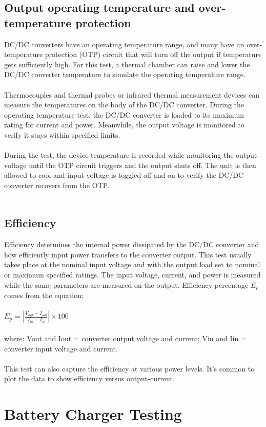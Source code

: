 \subsection{Output operating temperature and over-temperature protection} 

DC/DC converters have an operating temperature range, and many have an over-temperature protection (OTP) circuit that will turn off the output if temperature gets sufficiently high. For this test, a thermal chamber can raise and lower the DC/DC converter temperature to simulate the operating temperature range.
\\ \\
Thermocouples and thermal probes or infrared thermal measurement devices can measure the temperatures on the body of the DC/DC converter. During the operating temperature test, the DC/DC converter is loaded to its maximum rating for current and power. Meanwhile, the output voltage is monitored to verify it stays within specified limits.
\\ \\
During the test, the device temperature is recorded while monitoring the output voltage until the OTP circuit triggers and the output shuts off. The unit is then allowed to cool and input voltage is toggled off and on to verify the DC/DC converter recovers from the OTP.
\\ \\
\subsection{Efficiency} 

Efficiency determines the internal power dissipated by the DC/DC converter and how efficiently input power transfers to the converter output. This test usually takes place at the nominal input voltage and with the output load set to nominal or maximum specified ratings. The input voltage, current, and power is measured while the same parameters are measured on the output. Efficiency percentage $E_{p}$ comes from the equation:
\\ \\
\hspace*{5cm}$E_{p}$ = $\left | \frac{V_{out}-I_{out}}{V_{in}-I_{in}} \right | \times 100$
\\ \\
where:
Vout and Iout = converter output voltage and current;
Vin and Iin = converter input voltage and current.
\\ \\
This test can also capture the efficiency at various power levels. It’s common to plot the data to show efficiency versus output-current.

\section{Battery Charger Testing}



	







